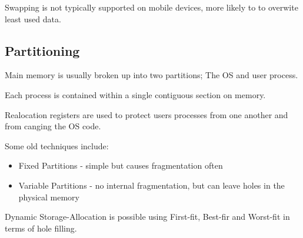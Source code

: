 \documentclass{article}
\begin{document}
Swapping is not typically supported on mobile devices, more likely to to overwite least used data.


\subsection{Partitioning}
Main memory is usually broken up into two partitions; The OS and user process.

Each process is contained within a single contiguous section on memory.

Realocation registers are used to protect users processes from one another and from canging the OS code.

Some old techniques include:
\begin{itemize}
    \item Fixed Partitions - simple but causes fragmentation often
    \item Variable Partitions - no internal fragmentation, but can leave holes in the physical memory
\end{itemize}

Dynamic Storage-Allocation is possible using First-fit, Best-fir and Worst-fit in terms of hole filling.
\end{document}
